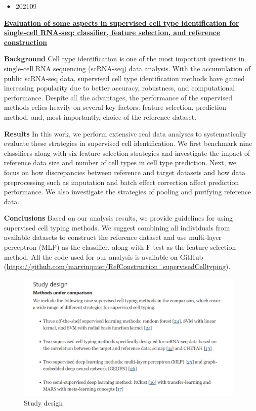 \documentclass[
]{book}
\providecommand{\tightlist}{%
  \setlength{\itemsep}{0pt}\setlength{\parskip}{0pt}}
\begin{document}
\begin{itemize}
\tightlist
\item
  202109
\end{itemize}

\textbf{\href{https://genomebiology.biomedcentral.com/articles/10.1186/s13059-021-02480-2}{Evaluation of some aspects in supervised cell type identification for single-cell RNA-seq: classifier, feature selection, and reference construction}\citep{ma2021evaluation}}

\textbf{Background}
Cell type identification is one of the most important questions in single-cell RNA sequencing (scRNA-seq) data analysis. With the accumulation of public scRNA-seq data, supervised cell type identification methods have gained increasing popularity due to better accuracy, robustness, and computational performance. Despite all the advantages, the performance of the supervised methods relies heavily on several key factors: feature selection, prediction method, and, most importantly, choice of the reference dataset.

\textbf{Results}
In this work, we perform extensive real data analyses to systematically evaluate these strategies in supervised cell identification. We first benchmark nine classifiers along with six feature selection strategies and investigate the impact of reference data size and number of cell types in cell type prediction. Next, we focus on how discrepancies between reference and target datasets and how data preprocessing such as imputation and batch effect correction affect prediction performance. We also investigate the strategies of pooling and purifying reference data.

\textbf{Conclusions}
Based on our analysis results, we provide guidelines for using supervised cell typing methods. We suggest combining all individuals from available datasets to construct the reference dataset and use multi-layer perceptron (MLP) as the classifier, along with F-test as the feature selection method. All the code used for our analysis is available on GitHub (\url{https://github.com/marvinquiet/RefConstruction_supervisedCelltyping}).

\begin{figure}
\centering
\includegraphics{./figs/pubmon/2021-2022/CELLTYPE_ANNO_BENCHMARK.png}
\caption{Study design}
\end{figure}
\end{document}

